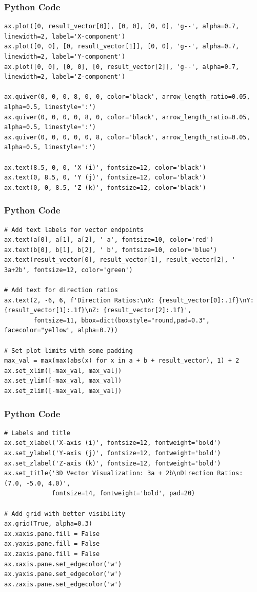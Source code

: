 \documentclass{beamer}
\begin{document}
\begin{frame}[fragile]
\frametitle{Python Code}
   \begin{lstlisting}
ax.plot([0, result_vector[0]], [0, 0], [0, 0], 'g--', alpha=0.7, linewidth=2, label='X-component')
ax.plot([0, 0], [0, result_vector[1]], [0, 0], 'g--', alpha=0.7, linewidth=2, label='Y-component')
ax.plot([0, 0], [0, 0], [0, result_vector[2]], 'g--', alpha=0.7, linewidth=2, label='Z-component')

ax.quiver(0, 0, 0, 8, 0, 0, color='black', arrow_length_ratio=0.05, alpha=0.5, linestyle=':')
ax.quiver(0, 0, 0, 0, 8, 0, color='black', arrow_length_ratio=0.05, alpha=0.5, linestyle=':')
ax.quiver(0, 0, 0, 0, 0, 8, color='black', arrow_length_ratio=0.05, alpha=0.5, linestyle=':')

ax.text(8.5, 0, 0, 'X (i)', fontsize=12, color='black')
ax.text(0, 8.5, 0, 'Y (j)', fontsize=12, color='black')
ax.text(0, 0, 8.5, 'Z (k)', fontsize=12, color='black')
\end{lstlisting}
\end{frame}
\begin{frame}[fragile]
\frametitle{Python Code}
   \begin{lstlisting}
# Add text labels for vector endpoints
ax.text(a[0], a[1], a[2], ' a', fontsize=10, color='red')
ax.text(b[0], b[1], b[2], ' b', fontsize=10, color='blue')
ax.text(result_vector[0], result_vector[1], result_vector[2], ' 3a+2b', fontsize=12, color='green')

# Add text for direction ratios
ax.text(2, -6, 6, f'Direction Ratios:\nX: {result_vector[0]:.1f}\nY: {result_vector[1]:.1f}\nZ: {result_vector[2]:.1f}', 
        fontsize=11, bbox=dict(boxstyle="round,pad=0.3", facecolor="yellow", alpha=0.7))

# Set plot limits with some padding
max_val = max(max(abs(x) for x in a + b + result_vector), 1) + 2
ax.set_xlim([-max_val, max_val])
ax.set_ylim([-max_val, max_val])
ax.set_zlim([-max_val, max_val])
\end{lstlisting}
\end{frame}
\begin{frame}[fragile]
\frametitle{Python Code}
   \begin{lstlisting}
# Labels and title
ax.set_xlabel('X-axis (i)', fontsize=12, fontweight='bold')
ax.set_ylabel('Y-axis (j)', fontsize=12, fontweight='bold')
ax.set_zlabel('Z-axis (k)', fontsize=12, fontweight='bold')
ax.set_title('3D Vector Visualization: 3a + 2b\nDirection Ratios: (7.0, -5.0, 4.0)', 
             fontsize=14, fontweight='bold', pad=20)

# Add grid with better visibility
ax.grid(True, alpha=0.3)
ax.xaxis.pane.fill = False
ax.yaxis.pane.fill = False
ax.zaxis.pane.fill = False
ax.xaxis.pane.set_edgecolor('w')
ax.yaxis.pane.set_edgecolor('w')
ax.zaxis.pane.set_edgecolor('w')
\end{lstlisting}
\end{frame}
\end{document}
